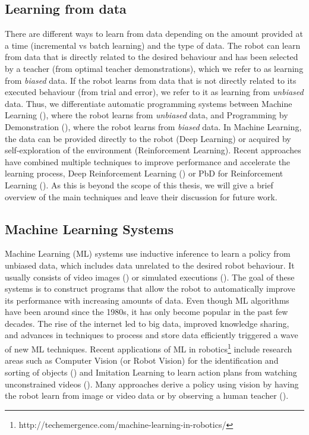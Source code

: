 \subsection{Learning from data} \label{subsec:Gathering data}
There are different ways to learn from data depending on the amount provided at a time (incremental vs batch learning) and the type of data.
The robot can learn from data that is directly related to the desired behaviour and has been selected by a teacher (\eg from optimal teacher demonstrations), which we refer to as learning from \textit{biased} data.
If the robot learns from data that is not directly related to its executed behaviour (\eg from trial and error), we refer to it as learning from \textit{unbiased} data.
Thus, we differentiate automatic programming systems between Machine Learning (), where the robot learns from \textit{unbiased} data, and Programming by Demonstration (), where the robot learns from \textit{biased} data.
In Machine Learning, the data can be provided directly to the robot (\eg Deep Learning) or acquired by self-exploration of the environment (\eg Reinforcement Learning).
Recent approaches have combined multiple techniques to improve performance and accelerate the learning process, \eg Deep Reinforcement Learning (\cite{arulkumaran2017brief}) or PbD for Reinforcement Learning (\cite{hester2017learning}).
As this is beyond the scope of this thesis, we will give a brief overview of the main techniques and leave their discussion for future work.


\subsection{Machine Learning Systems}\label{sssec:Learning Systems}
Machine Learning (ML) systems use inductive inference to learn a policy from unbiased data, which includes data unrelated to the desired robot behaviour.
It usually consists of video images (\cite{bibid}) or simulated executions (\cite{bibid}).
The goal of these systems is to construct programs that allow the robot to automatically improve its performance with increasing amounts of data. 
Even though ML algorithms have been around since the 1980s, it has only become popular in the past few decades. 
The rise of the internet led to big data, improved knowledge sharing, and advances in techniques to process and store data efficiently triggered a wave of new ML techniques.
Recent applications of ML in robotics\footnote{http://techemergence.com/machine-learning-in-robotics/} include research areas such as Computer Vision (or Robot Vision) for the identification and sorting of objects (\cite{stager2013computer}) and Imitation Learning to learn action plans from watching unconstrained videos (\cite{Yang2015}).
Many approaches derive a policy using vision by having the robot learn from image or video data or by observing a human teacher (\cite{kuniyoshi1994learning}).

